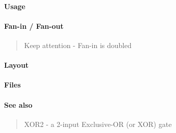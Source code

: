 \paragraph{Usage}

\paragraph{Fan-in / Fan-out}
\begin{quote}
    Keep attention - Fan-in is doubled
\end{quote}

\paragraph{Layout}

\paragraph{Files}


\paragraph{See also}
\begin{quote}
    XOR2 - a 2-input Exclusive-OR (or XOR) gate
\end{quote}
